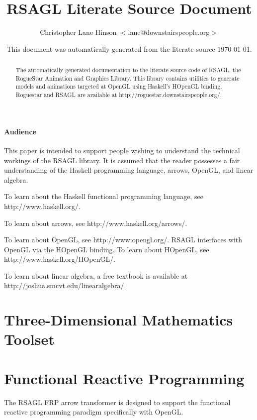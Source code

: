 \documentclass{article}
\author{Christopher Lane Hinson $<$lane@downstairspeople.org$>$}
\title{ RSAGL Literate Source Document }
\date{ This document was automatically generated from the literate source \today. }
\begin{document}
\maketitle

\begin{abstract}
The automatically generated documentation to the literate source code of RSAGL, 
the RogueStar Animation and Graphics Library.  This library contains utilities
to generate models and animations targeted at OpenGL using Haskell's HOpenGL
binding.  Roguestar and RSAGL are available at http://roguestar.downstairspeople.org/.
\end{abstract}

\tableofcontents

\subsection{Audience}

This paper is intended to support people wishing to understand the technical workings of
the RSAGL library.  It is assumed that the reader possesses a fair understanding
of the Haskell programming language, arrows, OpenGL, and linear algebra.

To learn about the Haskell functional programming language, see http://www.haskell.org/.

To learn about arrows, see http://www.haskell.org/arrows/.

To learn about OpenGL, see http://www.opengl.org/.  RSAGL interfaces with OpenGL via the
HOpenGL binding.  To learn about HOpenGL, see http://www.haskell.org/HOpenGL/.

To learn about linear algebra, a free textbook is available at http://joshua.smcvt.edu/linearalgebra/.

\part{Three-Dimensional Mathematics Toolset}



\part{Functional Reactive Programming}

The RSAGL FRP arrow transformer is designed to support the functional reactive programming paradigm
specifically with OpenGL.



\end{document}
